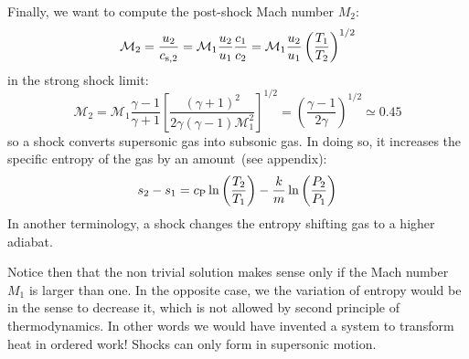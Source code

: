 Finally, we want to compute the post-shock Mach number \( M_2 \):
%
\begin{equation}
\mathcal M_2 = \frac{u_2}{c_{\rm s,2}} = \mathcal M_1 \frac{u_2}{u_1} \frac{c_1}{c_2} = \mathcal M_1 \frac{u_2}{u_1} \left( \frac{T_1}{T_2} \right)^{1/2}
\end{equation}
%
in the strong shock limit:
%
\begin{equation}
\mathcal M_2 = \mathcal M_1 \frac{\gamma - 1}{\gamma + 1} \left[ \frac{(\gamma + 1)^2}{2\gamma(\gamma - 1) \mathcal M_1^2} \right]^{1/2} = \left( \frac{\gamma - 1}{2\gamma} \right)^{1/2} \simeq 0.45 
\end{equation}
%
so a shock converts supersonic gas into subsonic gas.
%
In doing so, it increases the specific entropy of the gas by an amount~(see appendix):
%
\begin{equation}
s_2 - s_1 = c_{\rm P} \ln \left(\frac{T_2}{T_1}\right) - \frac{k}{m} \ln \left( \frac{P_2}{P_1} \right)
\end{equation}
%
In another terminology, a shock changes the entropy shifting gas to a higher adiabat.

Notice then that the non trivial solution makes sense only if the Mach number $M_1$ is larger than one. In the opposite case, we the variation of entropy would be in the sense to decrease it, which is not allowed by second principle of thermodynamics. 
%
In other words we would have invented a system to transform heat in ordered work! Shocks can only form in supersonic motion.
